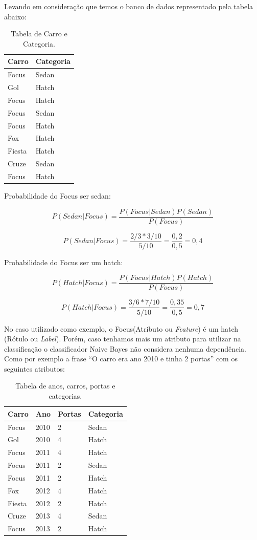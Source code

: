 Levando em consideração que temos o banco de dados representado pela tabela
abaixo:

\begin{table}[htb]
\centering
\label{123}
\begin{tabular}{|l|l|}
\hline
Carro  & Categoria \\ \hline
Focus  & Sedan     \\ \hline
Gol    & Hatch     \\ \hline
Focus  & Hatch     \\ \hline
Focus  & Sedan     \\ \hline
Focus  & Hatch     \\ \hline
Fox    & Hatch     \\ \hline
Fiesta & Hatch     \\ \hline
Cruze  & Sedan     \\ \hline
Focus  & Hatch     \\ \hline
\end{tabular} 
\caption{Tabela de Carro e Categoria.}
\end{table}

Probabilidade do Focus ser sedan:

\[ P(Sedan|Focus) = \frac{P(Focus|Sedan) P(Sedan)}{P(Focus)}  \]

\[ P(Sedan|Focus) = \frac{2/3 * 3/10}{5/10} = \frac{0,2}{0,5} = 0,4\]

Probabilidade do Focus ser um hatch:

\[ P(Hatch|Focus) = \frac{P(Focus|Hatch) P(Hatch)}{P(Focus)}  \]

\[ P(Hatch|Focus) = \frac{3/6 * 7/10}{5/10} = \frac{0,35}{0,5} = 0,7\]

No caso utilizado como exemplo, o Focus(Atributo ou \textit{Feature}) é um hatch
(Rótulo ou \textit{Label}).
Porém, caso tenhamos mais um atributo para utilizar na classificação o classificador Naive Bayes não
considera nenhuma dependência.
Como por exemplo a frase ``O carro era ano 2010 e tinha 2 portas'' com os
seguintes atributos:

\begin{table}[htb]
\centering
\begin{tabular}{|l|l|l|l|}
\hline
Carro  & Ano  & Portas & Categoria \\ \hline
Focus  & 2010 & 2      & Sedan     \\ \hline
Gol    & 2010 & 4      & Hatch     \\ \hline
Focus  & 2011 & 4      & Hatch     \\ \hline
Focus  & 2011 & 2      & Sedan     \\ \hline
Focus  & 2011 & 2      & Hatch     \\ \hline
Fox    & 2012 & 4      & Hatch     \\ \hline
Fiesta & 2012 & 2      & Hatch     \\ \hline
Cruze  & 2013 & 4      & Sedan     \\ \hline
Focus  & 2013 & 2      & Hatch     \\ \hline
\end{tabular}
\caption{Tabela de anos, carros, portas e categorias.}
\label{my-label}
\end{table}

